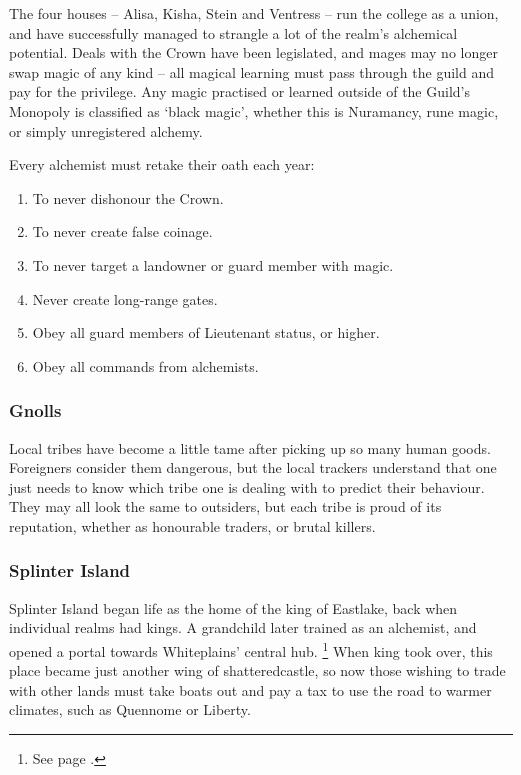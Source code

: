 \begin{multicols}{2}
The four houses -- Alisa, Kisha, Stein and Ventress -- run the college as a union, and have successfully managed to strangle a lot of the realm's alchemical potential.
Deals with the Crown have been legislated, and mages may no longer swap magic of any kind -- all magical learning must pass through the guild and pay for the privilege.
Any magic practised or learned outside of the Guild's Monopoly is classified as `black magic', whether this is Nuramancy, rune magic, or simply unregistered alchemy.

Every alchemist must retake their oath each year:

\needspace{3em}
\begin{enumerate}

  \item
  To never dishonour the Crown.
  \item
  To never create false coinage.
  \item
  To never target a landowner or \gls{guard} member with magic.
  \item
  Never create long-range gates.
  \item
  Obey all \gls{guard} members of Lieutenant status, or higher.
  \item
  Obey all commands from \gls{alchemists}.

\end{enumerate}

\subsubsection{Gnolls}

Local tribes have become a little tame after picking up so many human goods.
Foreigners consider them dangerous, but the local trackers understand that one just needs to know which tribe one is dealing with to predict their behaviour.
They may all look the same to outsiders, but each tribe is proud of its reputation, whether as honourable traders, or brutal killers.

\subsubsection{Splinter Island}

Splinter Island began life as the home of the king of Eastlake, back when individual realms had kings.
A grandchild later trained as an alchemist, and opened a portal towards Whiteplains' central hub.%
\footnote{See page \pageref{whiteland_heart}.}
When \gls{king} took over, this place became just another wing of \gls{shatteredcastle}, so now those wishing to trade with other lands must take boats out and pay a tax to use the road to warmer climates, such as Quennome or Liberty.


\end{multicols}
